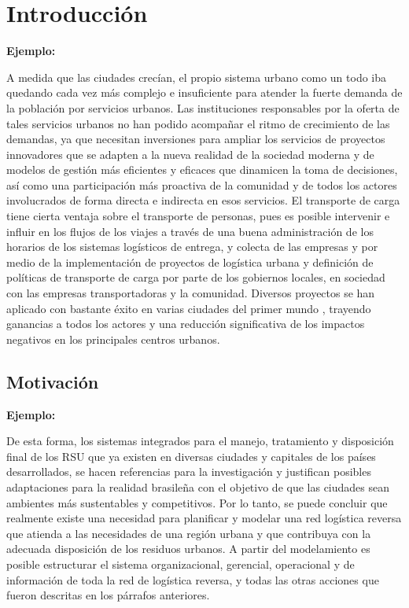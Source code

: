 \chapter{Introducción}
\setcounter{page}{1}
\renewcommand{\baselinestretch}{2} %

{\bf Ejemplo:}\par

A medida que las ciudades crecían, el propio sistema urbano como un todo iba quedando cada vez más complejo e insuficiente para atender la fuerte demanda de la población por servicios urbanos. Las instituciones responsables por la oferta de tales servicios urbanos no han podido acompañar el ritmo de crecimiento de las demandas, ya que necesitan inversiones para ampliar los servicios de proyectos innovadores que se adapten a la nueva realidad de la sociedad moderna y de modelos de gestión más eficientes y eficaces que dinamicen la toma de decisiones, así como una participación más proactiva de la comunidad y de todos los actores involucrados de forma directa e indirecta en esos servicios.   
\vskip 0.3cm
El transporte de carga tiene cierta ventaja sobre el transporte de personas, pues es posible intervenir e influir en los flujos de los viajes a través  de una buena administración de los horarios de los sistemas logísticos de entrega, y colecta de las empresas y por medio de la implementación de proyectos de logística urbana y definición de políticas de transporte de carga por parte de los gobiernos locales, en sociedad con las empresas transportadoras y la comunidad. Diversos proyectos se han aplicado con bastante éxito en varias ciudades del primer mundo \citep{Santos}, trayendo ganancias a todos los actores y una reducción significativa de los impactos negativos en los principales centros urbanos.    

\section{Motivación}

{\bf Ejemplo:}\par

De esta forma, los sistemas integrados para el manejo, tratamiento y disposición final de los RSU que ya existen en diversas ciudades y capitales de los países desarrollados, se hacen referencias para la investigación y justifican posibles adaptaciones para la realidad brasileña con el objetivo de que las ciudades sean ambientes más sustentables y competitivos.
\vskip 0.3cm
 Por lo tanto, se puede concluir que realmente existe una necesidad para planificar y modelar una red logística reversa que atienda a las necesidades de una región urbana y que contribuya con la adecuada disposición de los residuos urbanos. A partir del modelamiento es posible estructurar el sistema organizacional, gerencial, operacional y de información de toda la red  de logística reversa, y todas las otras acciones que fueron descritas en los párrafos anteriores.


